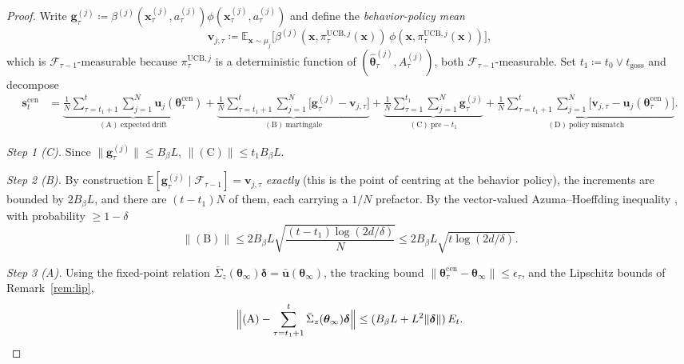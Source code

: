 \documentclass[11pt]{article}
\begin{document}
\begin{proof}
Write
$\bm{g}_\tau^{(j)}\coloneqq\beta^{(j)}(\bm{x}_\tau^{(j)},a_\tau^{(j)})
\phi(\bm{x}_\tau^{(j)},a_\tau^{(j)})$ and define the
\emph{behavior-policy mean}
\[
\bm{v}_{j,\tau}\coloneqq
\mathbb{E}_{\bm{x}\sim\mu_j}\bigl[
\beta^{(j)}(\bm{x},\pi_\tau^{\mathrm{UCB},j}(\bm{x}))\,
\phi(\bm{x},\pi_\tau^{\mathrm{UCB},j}(\bm{x}))\bigr],
\]
which is $\mathcal{F}_{\tau-1}$-measurable because
$\pi_\tau^{\mathrm{UCB},j}$ is a deterministic function of
$(\widehat{\bm\theta}_\tau^{(j)},A_\tau^{(j)})$, both
$\mathcal{F}_{\tau-1}$-measurable.  Set $t_1\coloneqq t_0\vee t_{\mathrm{goss}}$
and decompose \begin{align*}
\bm{s}_t^{\mathrm{cen}}&=
\underbrace{\frac{1}{N}\sum_{\tau=t_1+1}^t\sum_{j=1}^N
\bm{u}_j(\bm{\theta}_\tau^{\mathrm{cen}})}_{\mathrm{(A)\ expected\ drift}}
+\underbrace{\frac{1}{N}\sum_{\tau=t_1+1}^t\sum_{j=1}^N
\bigl[\bm{g}_\tau^{(j)}-\bm{v}_{j,\tau}\bigr]}_{\mathrm{(B)\ martingale}}
+\underbrace{\frac{1}{N}\sum_{\tau=1}^{t_1}\sum_{j=1}^N
\bm{g}_\tau^{(j)}}_{\mathrm{(C)\ pre-}t_1}
+\underbrace{\frac{1}{N}\sum_{\tau=t_1+1}^t\sum_{j=1}^N
\bigl[\bm{v}_{j,\tau}-\bm{u}_j(\bm{\theta}_\tau^{\mathrm{cen}})\bigr]}_{\mathrm{(D)\ policy\ mismatch}}.
\end{align*}

\textit{Step 1 (C).}  Since $\|\bm{g}_\tau^{(j)}\|\leq B_\beta L$,
$\|(\mathrm{C})\|\leq t_1 B_\beta L$.

\textit{Step 2 (B).}  By construction
$\mathbb{E}[\bm{g}_\tau^{(j)}\mid\mathcal{F}_{\tau-1}]=\bm{v}_{j,\tau}$
\emph{exactly} (this is the point of centring at the behavior policy),
the increments are bounded by $2B_\beta L$, and there are $(t-t_1)N$ of
them, each carrying a $1/N$ prefactor.
By the vector-valued Azuma--Hoeffding inequality
\citep[Thm.~1.8]{hayes2005}, with probability $\geq 1-\delta$ \[
\|(\mathrm{B})\|\leq 2B_\beta L\sqrt{\frac{(t-t_1)\log(2d/\delta)}{N}}
\leq 2B_\beta L\sqrt{t\log(2d/\delta)}.
\]

\textit{Step 3 (A).}  Using the fixed-point relation
$\bar{\Sigma}_z(\bm{\theta}_\infty)\bm{\delta}=\bar{\bm{u}}(\bm{\theta}_\infty)$,
the tracking bound
$\|\bm{\theta}_\tau^{\mathrm{cen}}-\bm{\theta}_\infty\|\leq\epsilon_\tau$,
and the Lipschitz bounds of Remark~\ref{rem:lip},
\[
\Bigl\|(\mathrm{A})-\sum_{\tau=t_1+1}^t\bar{\Sigma}_z(\bm{\theta}_\infty)\bm{\delta}\Bigr\|
\leq (B_\beta L+L^2\|\bm{\delta}\|)\,E_t .
\]


\end{proof}
\end{document}
